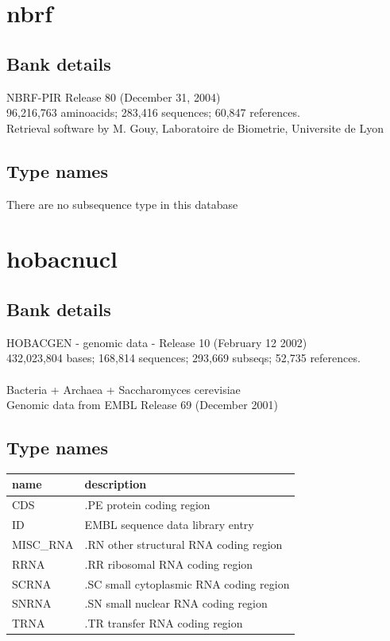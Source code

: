 \documentclass{article}
\begin{document}
\begin{Schunk}
\section{ nbrf }
\subsection{Bank details}
NBRF-PIR Release 80 (December 31, 2004)\\
96,216,763 aminoacids; 283,416 sequences; 60,847 references.\\
Retrieval software by M. Gouy, Laboratoire de Biometrie, Universite de Lyon

\subsection{Type names}
There are no subsequence type in this database
\section{ hobacnucl }
\subsection{Bank details}
HOBACGEN - genomic data - Release 10 (February 12 2002)\\
432,023,804 bases; 168,814 sequences; 293,669 subseqs; 52,735 references.\\
\\
Bacteria + Archaea + Saccharomyces cerevisiae\\
Genomic data from EMBL Release 69 (December 2001)\\


\subsection{Type names}
\noindent\begin{tabular}{ll}
\hline \hline
name & description\\
\hline
CDS & .PE protein coding region \\
ID & EMBL sequence data library entry \\
MISC\_RNA & .RN other structural RNA coding region \\
RRNA & .RR ribosomal RNA coding region \\
SCRNA & .SC small cytoplasmic RNA coding region \\
SNRNA & .SN small nuclear RNA coding region \\
TRNA & .TR transfer RNA coding region \\
\hline \hline
\end{tabular}


\end{Schunk}
\end{document}
